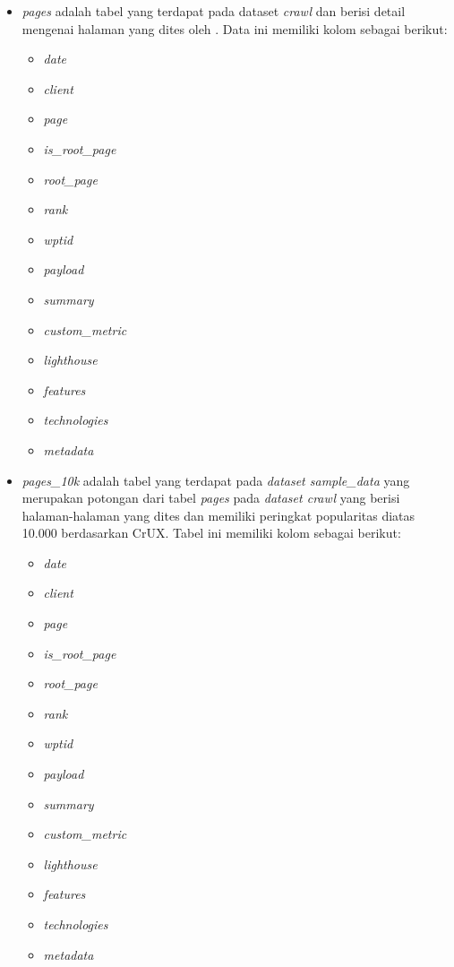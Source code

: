 \begin{itemize}
    \item \textit{pages} adalah tabel yang terdapat pada dataset \textit{crawl} dan berisi detail mengenai halaman yang dites oleh \http. Data ini memiliki kolom sebagai berikut:
    \begin{itemize}
        \item \textit{date}
        \item \textit{client}
        \item \textit{page}
        \item \textit{is\_root\_page}
        \item \textit{root\_page}
        \item \textit{rank}
        \item \textit{wptid}
        \item \textit{payload}
        \item \textit{summary}
        \item \textit{custom\_metric}
        \item \textit{lighthouse}
        \item \textit{features}
        \item \textit{technologies}
        \item \textit{metadata}
    \end{itemize}
    
    \item \textit{pages\_10k} adalah tabel yang terdapat pada \textit{dataset sample\_data} yang merupakan potongan dari tabel \textit{pages} pada \textit{dataset crawl} yang berisi halaman-halaman yang dites dan memiliki peringkat popularitas diatas 10.000 berdasarkan CrUX. Tabel ini memiliki kolom sebagai berikut:
    \begin{itemize}
        \item \textit{date}
        \item \textit{client}
        \item \textit{page}
        \item \textit{is\_root\_page}
        \item \textit{root\_page}
        \item \textit{rank}
        \item \textit{wptid}
        \item \textit{payload}
        \item \textit{summary}
        \item \textit{custom\_metric}
        \item \textit{lighthouse}
        \item \textit{features}
        \item \textit{technologies}
        \item \textit{metadata}
    \end{itemize}


\end{itemize}
